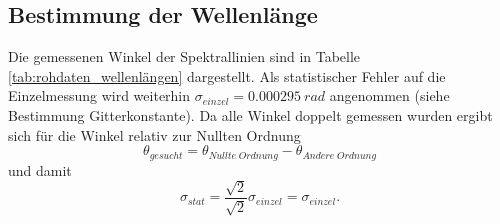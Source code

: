 \documentclass[12pt,a4paper]{article}
\begin{document}
	\subsection{Bestimmung der Wellenlänge}
	
	Die gemessenen Winkel der Spektrallinien sind in Tabelle \ref{tab:rohdaten_wellenlängen} dargestellt. Als statistischer Fehler auf die Einzelmessung wird weiterhin $\sigma_{einzel} = \SI{0.000295}{rad}$ angenommen (siehe Bestimmung Gitterkonstante). Da alle Winkel doppelt gemessen wurden ergibt sich für die Winkel relativ zur Nullten Ordnung
	\begin{equation}
	\theta_{gesucht} = \theta_{Nullte\;Ordnung} - \theta_{Andere\;Ordnung}
	\end{equation}
	und damit
	\begin{equation}
	\sigma_{stat} = \frac{\sqrt{2}}{\sqrt{2}} \sigma_{einzel} = \sigma_{einzel}.
	\end{equation}
\end{document}
